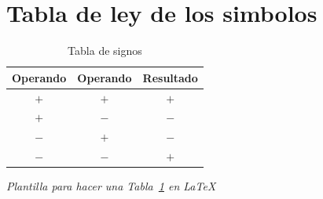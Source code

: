 \section{Tabla de ley de los simbolos}

	\begin{table}[h]
		\centering
		
		\label{tab:leyes_signos}
		\begin{tabular}{ | c | c | c | }
			
			\hline
			Operando & Operando & Resultado\\
			\hline
			$+$ & $+$ & $+$\\
			$+$ & $-$ & $-$\\
			$-$ & $+$ & $-$\\
			$-$ & $-$ & $+$\\
			\hline
			
		\end{tabular}
		\caption{Tabla de signos}
	\end{table}
	
	\centering\emph{Plantilla para hacer una \emph{Tabla}~\ref{tab:leyes_signos} en \LaTeX}
		
